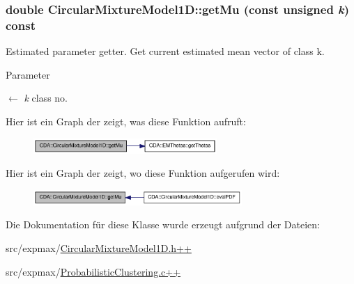 \hypertarget{classCDA_1_1CircularMixtureModel1D_aca9e252cb363b74f6ef2bacb7eb505f6}{
\subsubsection[{getMu}]{\setlength{\rightskip}{0pt plus 5cm}double CircularMixtureModel1D::getMu (const unsigned {\em k}) const}}
\label{classCDA_1_1CircularMixtureModel1D_aca9e252cb363b74f6ef2bacb7eb505f6}


Estimated parameter getter. Get current estimated mean vector of class k. 


\begin{DoxyParams}{Parameter}
\item[\mbox{$\leftarrow$} {\em k}]class no. \end{DoxyParams}


Hier ist ein Graph der zeigt, was diese Funktion aufruft:\nopagebreak
\begin{figure}[H]
\begin{center}
\leavevmode
\includegraphics[width=197pt]{classCDA_1_1CircularMixtureModel1D_aca9e252cb363b74f6ef2bacb7eb505f6_cgraph}
\end{center}
\end{figure}




Hier ist ein Graph der zeigt, wo diese Funktion aufgerufen wird:\nopagebreak
\begin{figure}[H]
\begin{center}
\leavevmode
\includegraphics[width=224pt]{classCDA_1_1CircularMixtureModel1D_aca9e252cb363b74f6ef2bacb7eb505f6_icgraph}
\end{center}
\end{figure}




Die Dokumentation für diese Klasse wurde erzeugt aufgrund der Dateien:\begin{DoxyCompactItemize}
\item 
src/expmax/\hyperlink{CircularMixtureModel1D_8h_09_09}{CircularMixtureModel1D.h++}\item 
src/expmax/\hyperlink{ProbabilisticClustering_8c_09_09}{ProbabilisticClustering.c++}\end{DoxyCompactItemize}
